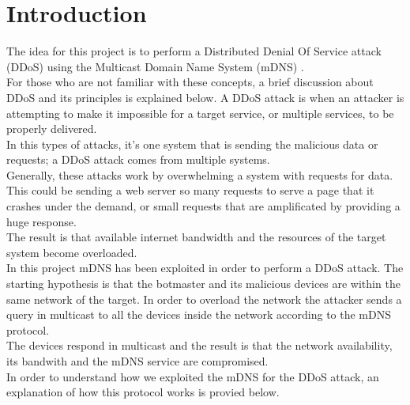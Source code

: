 \documentclass[fleqn, 10pt]{SelfArx} %
\affiliation{\textsuperscript{1}\textit{Department of Computer Engineering, University of Pavia, Pavia, Italy}} %
\affiliation{\textsuperscript{2}\textit{Enterprise Digital Infrastructure}} %
\affiliation{\textbf{Corresponding author}: francesco.amato01@universitadipavia.it} %
\begin{document}
\maketitle %

\tableofcontents %

\thispagestyle{empty} %


\section*{Introduction} %


The idea for this project is to perform a Distributed Denial Of Service attack (DDoS) \cite{DDoS} using the Multicast Domain Name System (mDNS) \cite{rfc6762}.\\
For those who are not familiar with these concepts, a brief discussion about DDoS and its principles is explained below.
A DDoS attack is when an attacker is attempting to make it impossible for a target service, or multiple services, to be properly delivered.\\
In this types of attacks, it’s one system that is sending the malicious data or requests; a DDoS attack comes from multiple systems.\\
Generally, these attacks work by overwhelming a system with requests for data. This could be sending a web server so many requests to serve a page that it crashes under the demand, or small requests that are amplificated by providing a huge response. \\ The result is that available internet bandwidth and the resources of the target system become overloaded.\\
In this project mDNS has been exploited in order to perform a DDoS attack. The starting hypothesis is that the botmaster and its malicious devices are within the same network of the target. In order to overload the network the attacker sends a query in multicast to all the devices inside the network according to the mDNS protocol. \\ The devices respond in multicast and the result is that the network availability, its bandwith and the mDNS service are compromised. \\
In order to understand how we exploited the mDNS for the DDoS attack, an explanation of how this protocol works is provied below.
\end{document}
